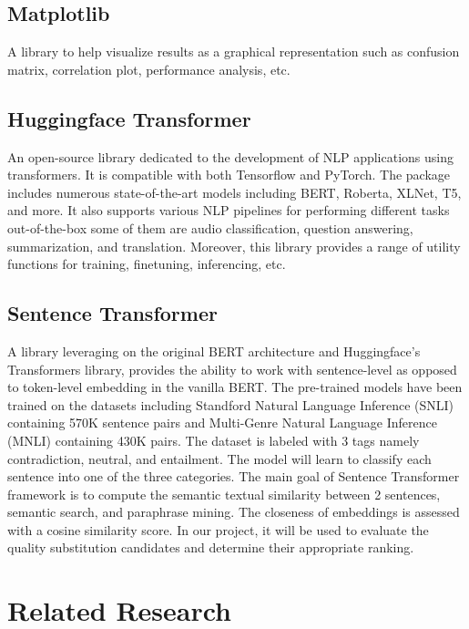 \documentclass[12pt,oneside,openright,a4paper]{cpe-english-project}
\begin{document}
\subsection{Matplotlib} 
A library to help visualize results as a graphical representation such as confusion matrix, correlation plot, performance analysis, etc. 



\subsection{Huggingface Transformer} 
An open-source library dedicated to the development of NLP applications using transformers. It is compatible with both Tensorflow and PyTorch. The package includes numerous state-of-the-art models including BERT, Roberta, XLNet, T5, and more. It also supports various NLP pipelines for performing different tasks out-of-the-box some of them are audio classification, question answering, summarization, and translation. Moreover, this library provides a range of utility functions for training, finetuning, inferencing, etc.

\subsection{Sentence Transformer} 
A library leveraging on the original BERT architecture and Huggingface’s Transformers library, provides the ability to work with sentence-level as opposed to token-level embedding in the vanilla BERT. The pre-trained models have been trained on the datasets including Standford Natural Language Inference (SNLI) containing 570K sentence pairs and Multi-Genre Natural Language Inference (MNLI) containing 430K pairs. The dataset is labeled with 3 tags namely contradiction, neutral, and entailment. The model will learn to classify each sentence into one of the three categories. The main goal of Sentence Transformer framework is to compute the semantic textual similarity between 2 sentences, semantic search, and paraphrase mining. The closeness of embeddings is assessed with a cosine similarity score. In our project, it will be used to evaluate the quality substitution candidates and determine their appropriate ranking.

\section{Related Research}
\end{document}
